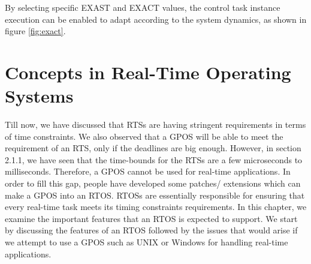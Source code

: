 \documentclass[12pt]{report}
\begin{document}
By selecting specific EXAST and EXACT values, the control task instance execution can be enabled to adapt according to the system dynamics, as shown in figure \ref{fig:exact}. 


\chapter{Concepts in Real-Time Operating Systems}
Till now, we have discussed that RTSs are having stringent requirements in terms of time constraints. We also observed that a GPOS will be able to meet the requirement of an RTS, only if the deadlines are big enough. However, in section 2.1.1, we have seen that the time-bounds for the RTSs are a few microseconds to milliseconds. Therefore, a GPOS cannot be used for real-time applications. In order to fill this gap, people have developed some patches/ extensions which can make a GPOS into an RTOS. RTOSs are essentially responsible for ensuring that every real-time task meets its timing constraints requirements. In this chapter, we examine the important features that an RTOS is expected to support. We start by discussing the features of an RTOS followed by the issues that would arise if we attempt to use a GPOS such as UNIX or Windows for handling real-time applications. 
\end{document}

